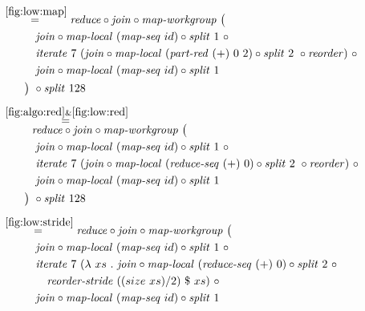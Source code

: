 \begin{align*}
%
  &\hspace{-2em}\quad\begin{aligned}
    &\overset{\ref{fig:low:map}}{=\hspace{.2em}}
      \reduce \circ \join \circ \mapWorkgroup\ \big(\\
    &\qquad\quad\join \circ \mapLocal\ (\mapSeq\ id) \circ \splitN\ 1\ \circ\\
    &\qquad\quad\iterateN\ 7\ (\join \circ \mapLocal\ (\partRed\ (+)\ 0\ 2) \circ \splitN\ 2\ \circ \reorder)\ \circ\\
    &\qquad\quad\join \circ \mapLocal\ (\mapSeq\ id) \circ \splitN\ 1\\
    &\qquad\big)\ \circ \splitN\ 128
  \end{aligned}\\[.5em]
%
  &\hspace{-2em}\quad\begin{aligned}
    &\overset{\ref{fig:algo:red}\&\ref{fig:low:red}}{=\hspace{.2em}}\\[-.75em]
    &\qquad\ \ 
      \reduce \circ \join \circ \mapWorkgroup\ \big(\\
    &\qquad\quad\join \circ \mapLocal\ (\mapSeq\ id) \circ \splitN\ 1\ \circ\\
    &\qquad\quad\iterateN\ 7\ (\join \circ \mapLocal\ (\reduceSeq\ (+)\ 0) \circ \splitN\ 2\ \circ \reorder)\ \circ\\
    &\qquad\quad\join \circ \mapLocal\ (\mapSeq\ id) \circ \splitN\ 1\\
    &\qquad\big)\ \circ \splitN\ 128
  \end{aligned}\\[.5em]
%
  &\hspace{-2em}\quad\begin{aligned}
    &\overset{\ref{fig:low:stride}}{=\hspace{.2em}}
      \reduce \circ \join \circ \mapWorkgroup\ \big(\\
    &\qquad\quad\join \circ \mapLocal\ (\mapSeq\ id) \circ \splitN\ 1\ \circ\\
    &\qquad\quad\iterateN\ 7\ (\lambda\ xs\ .\ \join \circ \mapLocal\ (\reduceSeq\ (+)\ 0) \circ \splitN\ 2\ \circ\\
    &\qquad\qquad \reorderStride\ ((size\ xs)/2)\ \$\ xs)\ \circ\\
    &\qquad\quad\join \circ \mapLocal\ (\mapSeq\ id) \circ \splitN\ 1\\

\end{aligned}
\end{align*}

